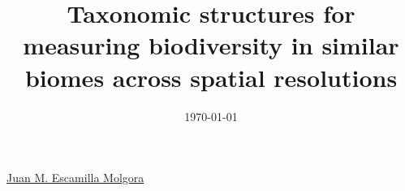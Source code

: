 \documentclass{ecsreport}      %
\begin{document}
\title      {Taxonomic structures for measuring biodiversity in similar biomes across spatial resolutions}
\authors  
             {\href{mailto:jmem1a@soton.ac.uk}{Juan M. Escamilla Molgora}}
\addresses  {\groupname\\\deptname\\\univname}
\date       {\today}
\subject    {Ecosystem Science, Ecology, Evolutionary Biology, Geostatistics}
\keywords   {}
%




%

%
%


\end{document}
